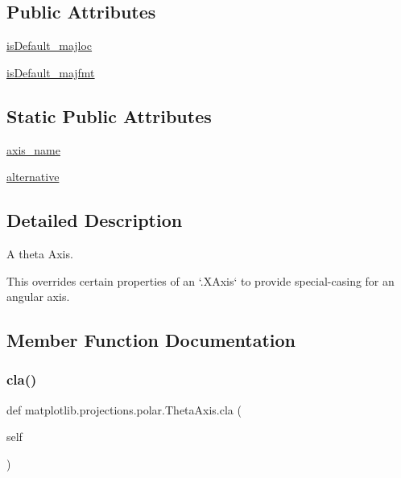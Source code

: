 \subsection*{Public Attributes}
\begin{DoxyCompactItemize}
\item 
\hyperlink{classmatplotlib_1_1projections_1_1polar_1_1ThetaAxis_adbf681cb8b5c277d9b94df68b513aa1b}{is\+Default\+\_\+majloc}
\item 
\hyperlink{classmatplotlib_1_1projections_1_1polar_1_1ThetaAxis_a6937da919898712f07d82c86b7d22b09}{is\+Default\+\_\+majfmt}
\end{DoxyCompactItemize}
\subsection*{Static Public Attributes}
\begin{DoxyCompactItemize}
\item 
\hyperlink{classmatplotlib_1_1projections_1_1polar_1_1ThetaAxis_aa0372278178351a5cbd62b20c6490bad}{axis\+\_\+name}
\item 
\hyperlink{classmatplotlib_1_1projections_1_1polar_1_1ThetaAxis_adc3330a962887e2aeb428ec3f854b52a}{alternative}
\end{DoxyCompactItemize}


\subsection{Detailed Description}
\begin{DoxyVerb}A theta Axis.

This overrides certain properties of an `.XAxis` to provide special-casing
for an angular axis.
\end{DoxyVerb}
 

\subsection{Member Function Documentation}
\mbox{\label{classmatplotlib_1_1projections_1_1polar_1_1ThetaAxis_a3bab80a709f62d50a601515ee00394d4}} 
\subsubsection{\texorpdfstring{cla()}{cla()}}
{\footnotesize\ttfamily def matplotlib.\+projections.\+polar.\+Theta\+Axis.\+cla (\begin{DoxyParamCaption}\item[{}]{self }\end{DoxyParamCaption})}

